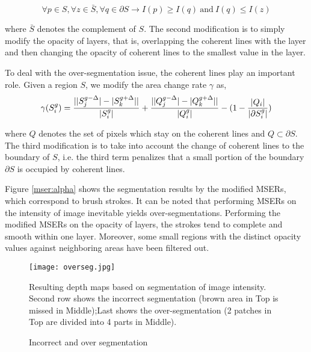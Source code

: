\begin{equation*}
 \forall p \in S,\forall z \in   \bar{S} , \forall q \in \partial S \longrightarrow I(p) \geq I(q)  ~\mathrm{and}~  I(q) \leq I(z)
\end{equation*}
 
where $ \bar{S} $ denotes the complement of $S$. The second modification is to simply modify the opacity of layers, that is, overlapping the coherent lines with the layer and then changing the opacity of coherent lines to the smallest value in the layer.

To deal with the over-segmentation issue, the coherent lines play an important role. Given a region $S$, we modify the area change rate $\gamma$ as,
\begin{equation}
\gamma(S_i^g)=\frac{  \lvert \lvert S_j^{g-\Delta}\rvert -\lvert S_k^{g+\Delta} \rvert
	 \rvert     }{\arrowvert S_i^g\arrowvert} + \frac{  \lvert \lvert Q_j^{g-\Delta}\rvert -\lvert Q_k^{g+\Delta} \rvert
	 \rvert     }{\arrowvert Q_i^g\arrowvert} - (1-\frac{\lvert Q_i\rvert}{\lvert \partial S_i^g \rvert} )
\end{equation}


where $Q$ denotes the set of pixels which stay on the coherent lines and $Q \subset \partial S $. The third modification is to take into account the change of coherent lines to the boundary of $S$, i.e. the third term penalizes that a small portion of the boundary $\partial S$ is occupied by coherent lines.

Figure \ref{mser:alpha} shows the segmentation results by the modified MSERs, which correspond to brush strokes. It can be noted that performing MSERs on the intensity of image inevitable yields over-segmentations. Performing the modified MSERs on the opacity of layers, the strokes tend to complete and smooth within one layer. Moreover, some small regions with the distinct opacity values against neighboring areas have been filtered out.
 


\begin{figure}[H]
	\centering
	\texttt{[image: overseg.jpg]}
	\caption{Incorrect and over segmentation}
	\label{overseg}
	\medskip
	Resulting depth maps based on segmentation of image intensity. Second row shows the incorrect segmentation (brown area in Top is missed in Middle);Last shows the over-segmentation (2 patches in Top are divided into 4 parts in Middle).
\end{figure}






